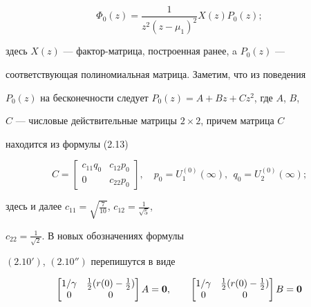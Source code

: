 \begin{equation} 


\Phi_0(z)=\frac{1}{z^2(z-\mu_1)^2}X(z)P_0(z); 


\end{equation} 


здесь $X(z)$ --- фактор-матрица, построенная ранее, a $P_0(z)$ --- 


соответствующая полиномиальная матрица. Заметим, что из поведения 


$P_0(z)$ на бесконечности следует $P_0(z)=A+B z+C z^2$, где $A$, $B$, 


$C$ --- числовые действительные матрицы $2\times 2$, причем матрица $C$ 


находится из формулы (2.13) 


$$ 


C= \begin{bmatrix} 


c_{11}q_0 & c_{12}p_0 \\ 0 & c_{22}p_0 


\end{bmatrix} 


,\quad 


p_0=U^{(0)}_1(\infty),\ \ q_0=U^{(0)}_2(\infty); 


$$ 


здесь и далее $c_{11}=\sqrt{\frac{7}{10}}$, $c_{12}=\frac{1}{\sqrt{5}}$, 


$c_{22}=\frac{1}{\sqrt{2}}$. В новых обозначениях формулы 


$(2.10')$, $(2.10'')$ перепишутся в виде 


\begin{equation} 


\begin{bmatrix} 


1/\gamma & \frac{1}{2}(r(0)-\frac{1}{2}) \\ 0 & 0 


\end{bmatrix} 


A=\bold 0,\qquad 


\begin{bmatrix} 


1/\gamma & \frac{1}{2}(r(0)-\frac{1}{2}) \\ 0 & 0 


\end{bmatrix} 


B=\bold 0 


\end{equation} 


